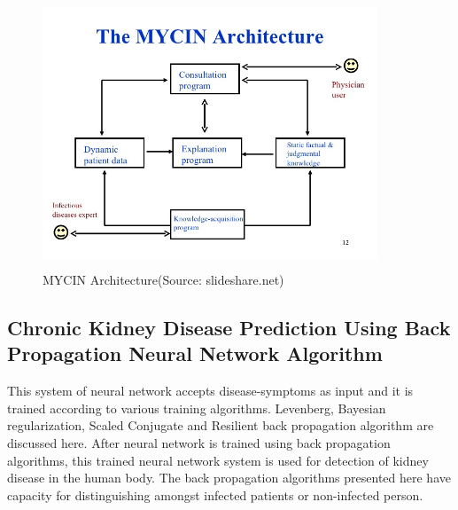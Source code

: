 \begin{figure}[H]
\begin{center}
\includegraphics[width=100mm, height = 80mm]{images/mycin.jpg}
\caption{MYCIN Architecture(Source: slideshare.net)}
\end{center}
\end{figure}
\subsection{Chronic Kidney Disease Prediction Using Back Propagation Neural Network Algorithm}
This system of neural network accepts disease-symptoms as input and it is trained according to various training algorithms. Levenberg, Bayesian regularization, Scaled Conjugate and Resilient back propagation algorithm are discussed here. After neural network is trained using back propagation algorithms, this trained neural network system is used for detection of kidney disease in the human body. The back propagation algorithms presented here have capacity for distinguishing amongst infected patients or non-infected person.
